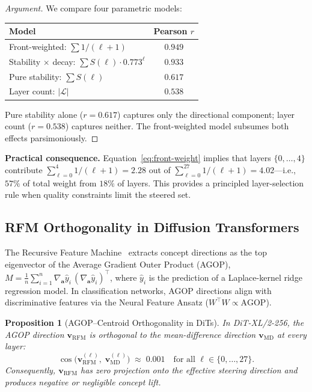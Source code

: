 \documentclass{article}
\newtheorem{proposition}[theorem]{Proposition}
\theoremstyle{definition}
\newcommand{\ba}{\mathbf{a}}
\newcommand{\bv}{\mathbf{v}}
\begin{document}
\begin{proof}[Argument]
We compare four parametric models:
\vspace{-0.5em}
\begin{center}
\small
\begin{tabular}{lc}
\toprule
Model & Pearson $r$ \\
\midrule
Front-weighted: $\sum 1/(\ell+1)$ & $\mathbf{0.949}$ \\
Stability $\times$ decay: $\sum S(\ell) \cdot 0.773^{\ell}$ & $0.933$ \\
Pure stability: $\sum S(\ell)$ & $0.617$ \\
Layer count: $|\mathcal{L}|$ & $0.538$ \\
\bottomrule
\end{tabular}
\end{center}
\vspace{-0.5em}
Pure stability alone ($r = 0.617$) captures only the directional component; layer count ($r = 0.538$) captures neither.
The front-weighted model subsumes both effects parsimoniously.
\end{proof}

\textbf{Practical consequence.}
Equation~\eqref{eq:front-weight} implies that layers $\{0, \ldots, 4\}$ contribute $\sum_{\ell=0}^{4} 1/(\ell+1) = 2.28$ out of $\sum_{\ell=0}^{27} 1/(\ell+1) = 4.02$---i.e., $57\%$ of total weight from $18\%$ of layers.
This provides a principled layer-selection rule when quality constraints limit the steered set.

\subsection{RFM Orthogonality in Diffusion Transformers}
\label{sec:rfm}

The Recursive Feature Machine~\citep{radhakrishnan2024mechanism} extracts concept directions as the top eigenvector of the Average Gradient Outer Product (AGOP), $M = \frac{1}{n}\sum_{i=1}^n \nabla_{\ba} \hat{y}_i \, (\nabla_{\ba} \hat{y}_i)^\top$, where $\hat{y}_i$ is the prediction of a Laplace-kernel ridge regression model.
In classification networks, AGOP directions align with discriminative features via the Neural Feature Ansatz ($W^\top W \propto \mathrm{AGOP}$).

\begin{proposition}[AGOP--Centroid Orthogonality in DiTs]
\label{prop:rfm}
In DiT-XL/2-256, the AGOP direction $\bv_{\mathrm{RFM}}$ is orthogonal to the mean-difference direction $\bv_{\mathrm{MD}}$ at every layer:
\begin{equation}
  \cos\bigl(\bv_{\mathrm{RFM}}^{(\ell)},\; \bv_{\mathrm{MD}}^{(\ell)}\bigr) \;\approx\; 0.001 \quad \text{for all } \ell \in \{0, \ldots, 27\}.
  \label{eq:rfm-orth}
\end{equation}
Consequently, $\bv_{\mathrm{RFM}}$ has zero projection onto the effective steering direction and produces negative or negligible concept lift.
\end{proposition}
\end{document}
